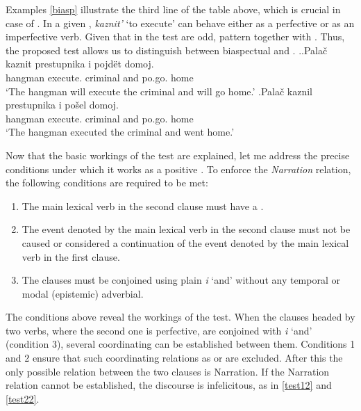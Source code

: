 Examples \ref{biasp} illustrate the third line of the table above, which is crucial in case of . In a given , \textit{kaznit'} `to execute' can behave either as a perfective or as an imperfective verb. Given that in the test   are odd,  pattern together with . Thus, the proposed test  allows us to distinguish between biaspectual and . 
\ex.\label{biasp}\ag.Pala\v{c} kaznit prestupnika i pojd\"et\textsuperscript{\PF} domoj.\\
hangman execute. criminal and po.go. home\\
`The hangman will execute the criminal and will go home.'
\bg.Pala\v{c} kaznil prestupnika i po\v{s}el\textsuperscript{\PF} domoj.\\
hangman execute. criminal and po.go. home\\
`The hangman executed the criminal and went home.'

Now that the basic workings of the test are explained, let me address the precise conditions under which it works as a positive . To enforce the \textit{Narration} relation, the following conditions are required to be met:
\begin{enumerate}
\item The main lexical verb in the second clause must have a .
\item The event denoted by the main lexical verb in the second clause must not be caused or considered a continuation of the event denoted by the main lexical verb in the first clause.
\item The clauses must be conjoined using plain  \textit{i} `and' without any temporal or modal (epistemic) adverbial.
\end{enumerate}
The conditions above reveal the workings of the test. When the clauses headed by two verbs, where the second one is perfective, are conjoined with \textit{i} `and' (condition 3), several coordinating  can be established between them. Conditions 1 and 2 ensure that such coordinating relations as  or  are excluded. After this the only possible relation between the two clauses is Narration. If the Narration relation  cannot be established, the discourse is infelicitous, as in \ref{test12} and \ref{test22}.

